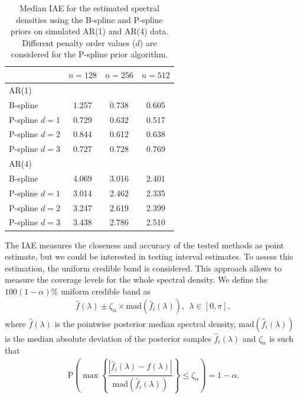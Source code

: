 \documentclass[aps,reprint,amsmath,amssymb,showpacs,showkeys]{revtex4-1}%
\begin{document}
\begin{table}
	\centering
	\begin{ruledtabular}
	\begin{tabular}{lccc}
		\toprule
		          & $n=128$ & $n=256$ & $n=512$ \\ \hline
		AR(1)     &  &  &  \\ 
		B-spline &  1.257 & 0.738 & 0.605  \\
		P-spline $d=1$ &  0.729 & 0.632 & 0.517  \\
		P-spline $d=2$&  0.844 & 0.612 & 0.638  \\
		P-spline $d=3$&  0.727 & 0.728 & 0.769  \\ \hline
		AR(4)     &  &  &  \\ 
		B-spline & 4.069 & 3.016 & 2.401   \\
		P-spline $d=1$ & 3.014 & 2.462 & 2.335  \\
		P-spline $d=2$& 3.247 & 2.619 & 2.399 \\
		P-spline $d=3$& 3.438 & 2.786 & 2.510  \\		
		\bottomrule
	\end{tabular}
	\end{ruledtabular}
	\caption{Median IAE for the estimated spectral densities using the B-spline and P-spline priors on simulated AR(1) and AR(4) data.  Different penalty order values ($d$) are considered for the P-spline prior algorithm.}
	\label{table:sim_IAE}
\end{table}


The IAE measures the closeness and accuracy of the tested methods as point estimate, but we could be interested in testing interval estimates.  To assess this estimation, the uniform credible band is considered.  This approach allows to measure the coverage levels for the whole spectral density.  We define the $100(1-\alpha)\%$ uniform credible band as
\begin{align*}
 \widehat{f}(\lambda) \pm \zeta_\alpha \times \text{mad} \left( \widehat{f}_i (\lambda) \right), \:\: \lambda \in [0,\pi],
\end{align*}
where $\widehat{f}(\lambda)$ is the pointwise posterior median spectral density, $\text{mad}( \widehat{f}_i (\lambda))$ is the median absolute deviation of the posterior samples $\widehat{f}_i (\lambda)$ and $\zeta_\alpha$ is such that
\begin{align*}
 \text{P}\left( \max \left\{ \dfrac{|\widehat{f}_i (\lambda) - \widehat{f} (\lambda)|}{\text{mad}(\widehat{f}_i (\lambda))} \right\} \leq \zeta_{\alpha} \right) = 1 - \alpha.
\end{align*}
\end{document}
